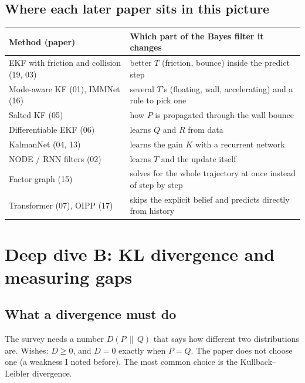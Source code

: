 \documentclass[11pt,a4paper]{article}
\begin{document}
\subsection{Where each later paper sits in this picture}
\begin{center}
\renewcommand{\arraystretch}{1.2}
\begin{tabularx}{\textwidth}{@{}l X@{}}
\toprule
Method (paper) & Which part of the Bayes filter it changes \\
\midrule
EKF with friction and collision (19, 03) & better $T$ (friction, bounce) inside the predict step \\
Mode-aware KF (01), IMMNet (16) & several $T$'s (floating, wall, accelerating) and a rule to pick one \\
Salted KF (05) & how $P$ is propagated through the wall bounce \\
Differentiable EKF (06) & learns $Q$ and $R$ from data \\
KalmanNet (04, 13) & learns the gain $K$ with a recurrent network \\
NODE / RNN filters (02) & learns $T$ and the update itself \\
Factor graph (15) & solves for the whole trajectory at once instead of step by step \\
Transformer (07), OIPP (17) & skips the explicit belief and predicts directly from history \\
\bottomrule
\end{tabularx}
\end{center}

\section{Deep dive B: KL divergence and measuring gaps}

\subsection{What a divergence must do}
The survey needs a number $D(P\,\|\,Q)$ that says how different two distributions are. Wishes:
$D\ge 0$, and $D=0$ exactly when $P=Q$. The paper does not choose one (a weakness I noted before).
The most common choice is the Kullback--Leibler divergence.
\end{document}
